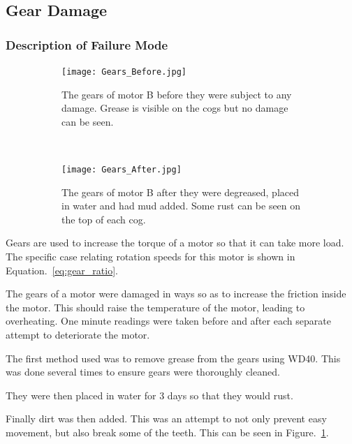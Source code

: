 
\subsection{Gear Damage}

\subsubsection{Description of Failure Mode}

\begin{figure}[t!]
    \centering
    \begin{subfigure}[t]{0.5\textwidth}
        \centering
        \texttt{[image: Gears\_Before.jpg]}
        \caption[Healthy Gears]{The gears of motor B before they were subject to any damage. Grease is visible on the cogs but no damage can be seen.}
    \end{subfigure}%
    ~ 
    \begin{subfigure}[t]{0.5\textwidth}
        \centering
         \texttt{[image: Gears\_After.jpg]}
    \caption[Damaged Gears]{The gears of motor B after they were degreased, placed in water and had mud added. Some rust can be seen on the top of each cog.}
    \end{subfigure}
    \caption[Motor Gears]{}
    \label{fig:gear_damage}
\end{figure}

Gears are used to increase the torque of a motor so that it can take more load. The specific case relating rotation speeds for this motor is shown in Equation.~\eqref{eq:gear_ratio}.

The gears of a motor were damaged in ways so as to increase the friction inside the motor. This should raise the temperature of the motor, leading to overheating. One minute readings were taken before and after each separate attempt to deteriorate the motor. 

The first method used was to remove grease from the gears using WD40. This was done several times to ensure gears were thoroughly cleaned.

They were then placed in water for 3 days so that they would rust.

Finally dirt was then added. This was an attempt to not only prevent easy movement, but also break some of the teeth. This can be seen in Figure.~\ref{fig:gear_damage}.

